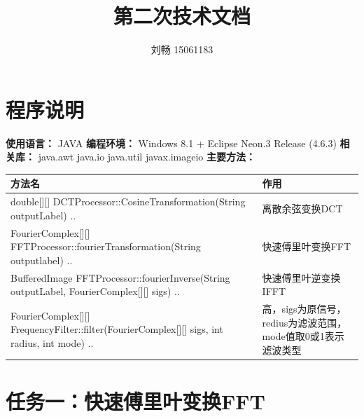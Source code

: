 \documentclass[UTF8]{ctexart}
\title{第二次技术文档}
\author{刘畅 15061183}
\begin{document}
	\maketitle
	\section{程序说明}
	\noindent
	\textbf{使用语言：} JAVA \newline
	\textbf{编程环境：} Windows 8.1 + Eclipse Neon.3 Release (4.6.3) \newline
	\textbf{相关库：}\newline
	\indent java.awt\newline
	\indent java.io\newline
	\indent java.util\newline
	\indent javax.imageio\newline
	\textbf{主要方法：} \newline
	\begin{tabular}{p{10cm}p{7cm}}
	\hline
	\textbf{方法名}& \textbf{作用} \\
	\hline
	double[][] DCTProcessor::CosineTransformation(String outputLabel) {..}&  离散余弦变换DCT\\
	\hline
	FourierComplex[][] FFTProcessor::fourierTransformation(String outputlabel) {..}&  快速傅里叶变换FFT\\
	\hline
	BufferedImage FFTProcessor::fourierInverse(String outputLabel, FourierComplex[][] sigs) {..}&  快速傅里叶逆变换IFFT\\
	\hline
	FourierComplex[][] FrequencyFilter::filter(FourierComplex[][] sigs, int radius, int mode) {..}& 高，sigs为原信号，redius为滤波范围，mode值取0或1表示滤波类型 \\
	\hline
	\end{tabular}

	\section{任务一：快速傅里叶变换FFT}
\end{document}
